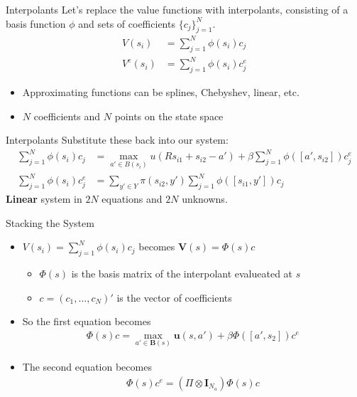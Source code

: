 \documentclass{beamer}
\begin{document}
\begin{frame}{Interpolants}
Let's replace the value functions with interpolants, consisting of a basis function $\phi$ and sets of coefficients $\{c_j \}_{j=1}^N$.
\begin{align*}
V(s_i) &= \displaystyle \sum_{j=1}^{N} \phi(s_i) c_j \\
V^e(s_i) &= \displaystyle \sum_{j=1}^{N} \phi(s_i) c_j^e
\end{align*}
\begin{itemize}
\item Approximating functions can be splines, Chebyshev, linear, etc.
\item $N$ coefficients and $N$ points on the state space
\end{itemize}
\end{frame}

\begin{frame}{Interpolants}
Substitute these back into our system:
\begin{align*}
    \displaystyle \sum_{j=1}^{N} \phi(s_i) c_j &= \max_{a' \in B(s_i)} u(Rs_{i1} + s_{i2} - a') + \beta \displaystyle \sum_{j=1}^{N} \phi([a', s_{i2}]) c_j^e \\
    \displaystyle \sum_{j=1}^{N} \phi(s_i) c_j^e &= \displaystyle \sum_{y' \in Y} \pi(s_{i2}, y') \displaystyle \sum_{j=1}^{N} \phi([s_{i1}, y']) c_j
\end{align*}
\textbf{Linear} system in $2N$ equations and $2N$ unknowns.
\end{frame}

\begin{frame}{Stacking the System}
\begin{itemize}
\item $V(s_i) = \displaystyle \sum_{j=1}^{N} \phi(s_i) c_j$ becomes $\mathbf{V}(s) = \Phi(s)c$
\begin{itemize}
\item $\Phi(s)$ is the basis matrix of the interpolant evalueated at $s$
\item $c = (c_1, \hdots, c_N)'$ is the vector of coefficients
\end{itemize}
\item So the first equation becomes
\begin{align*}
\Phi(s)c = \max_{a' \in \mathbf{B}(s)} \mathbf{u}(s, a') + \beta \Phi([a', s_2]) c^e
\end{align*}
\item The second equation becomes
\begin{align*}
\Phi(s)c^e = (\Pi \otimes \mathbf{I}_{N_a}) \Phi (s) c
\end{align*}
\end{itemize}
\end{frame}
\end{document}
